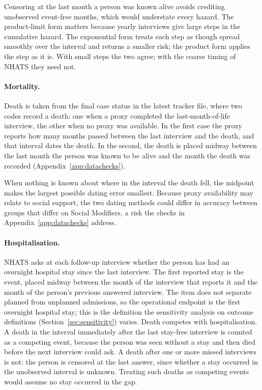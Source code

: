 Censoring at the last month a person was known alive avoids crediting unobserved event-free months, which would understate every hazard. The product-limit form matters because yearly interviews give large steps in the cumulative hazard. The exponential form treats each step as though spread smoothly over the interval and returns a smaller risk; the product form applies the step as it is. With small steps the two agree; with the coarse timing of NHATS they need not.

\paragraph{Mortality.} Death is taken from the final case status in the latest tracker file, where two codes record a death: one when a proxy completed the last-month-of-life interview, the other when no proxy was available. In the first case the proxy reports how many months passed between the last interview and the death, and that interval dates the death. In the second, the death is placed midway between the last month the person was known to be alive and the month the death was recorded (Appendix~\ref{app:datachecks}).

When nothing is known about where in the interval the death fell, the midpoint makes the largest possible dating error smallest. Because proxy availability may relate to social support, the two dating methods could differ in accuracy between groups that differ on Social Modifiers, a risk the checks in Appendix~\ref{app:datachecks} address.

\paragraph{Hospitalisation.} NHATS asks at each follow-up interview whether the person has had an overnight hospital stay since the last interview. The first reported stay is the event, placed midway between the month of the interview that reports it and the month of the person's previous answered interview. The item does not separate planned from unplanned admissions, so the operational endpoint is the first overnight hospital stay; this is the definition the sensitivity analysis on outcome definitions (Section~\ref{sec:sensitivity}) varies. Death competes with hospitalisation. A death in the interval immediately after the last stay-free interview is counted as a competing event, because the person was seen without a stay and then died before the next interview could ask. A death after one or more missed interviews is not: the person is censored at the last answer, since whether a stay occurred in the unobserved interval is unknown. Treating such deaths as competing events would assume no stay occurred in the gap.

